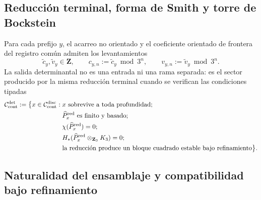 \subsection{Reducción terminal, forma de Smith y torre de Bockstein}
Para cada prefijo \(y\), el acarreo no orientado y el coeficiente orientado
de frontera del registro común admiten los levantamientos
\begin{equation}
\label{eq:detint-c-v-lifts}
 \widetilde c_y,\widetilde v_y\in\mathbf Z,\qquad
 c_{y,n}:=\widetilde c_y\bmod3^n,\qquad
 v_{y,n}:=\widetilde v_y\bmod3^n.
\end{equation}
La salida determinantal no es una entrada ni una rama separada: es el sector
producido por la misma reducción terminal cuando se verifican las condiciones
tipadas
\begin{equation}
\label{eq:detint-dominio}
\begin{split}
 \mathcal C_{\rm cont}^{\rm det}:=\bigl\{x\in\mathcal C_{\rm cont}^{\rm disc}:{}&
 x\text{ sobrevive a toda profundidad};\\
 &\widehat P_x^{\rm red}\text{ es finito y basado};\\
 &\chi(\widehat P_x^{\rm red})=0;\\
 &H_*(\widehat P_x^{\rm red}\otimes_{\mathbf Z_3}K_3)=0;\\
 &\text{la reducción produce un bloque cuadrado estable bajo refinamiento}
 \bigr\}.
\end{split}
\end{equation}
\begingroup
  \let\section\subsection
  
\endgroup

\section{Naturalidad del ensamblaje y compatibilidad bajo refinamiento}

